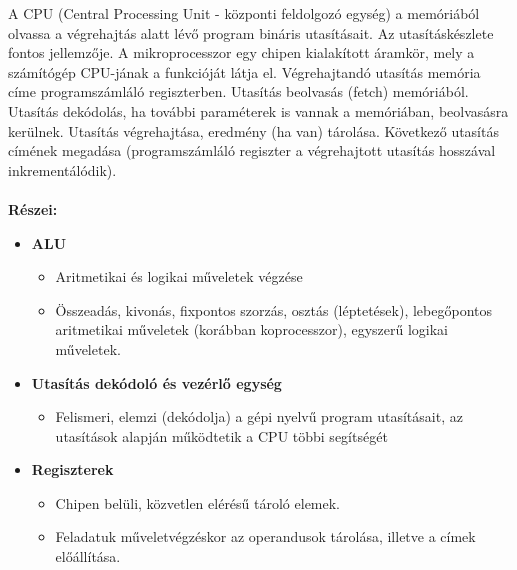 \documentclass[11pt,a4paper]{article}
\begin{document}
            \begin{tcolorbox}[colback=blue!5!white,colframe=blue!50!black,title= 13. Ismertesse a CPU részeit és működését egy utasítás végrehajtási folyamatában!]
            A CPU (Central Processing Unit - központi feldolgozó egység) a memóriából olvassa a
            végrehajtás alatt lévő program bináris utasításait. Az utasításkészlete fontos jellemzője.
            A mikroprocesszor egy chipen kialakított áramkör, mely a számítógép CPU-jának a
            funkcióját látja el. Végrehajtandó utasítás memória címe programszámláló regiszterben. Utasítás beolvasás (fetch) memóriából.
            Utasítás dekódolás, ha további paraméterek is vannak a memóriában,
            beolvasásra kerülnek.
            Utasítás végrehajtása, eredmény (ha van) tárolása.
            Következő utasítás címének megadása (programszámláló regiszter a
            végrehajtott utasítás hosszával inkrementálódik).\\
            \\
            \textbf{Részei:}  
                \begin{itemize}
                    \item \textbf{ALU}
                    \begin{itemize}
                        \item Aritmetikai és logikai műveletek végzése
                        \item Összeadás, kivonás, fixpontos szorzás, osztás (léptetések), lebegőpontos aritmetikai
                    műveletek (korábban koprocesszor), egyszerű logikai műveletek.
                    \end{itemize}
                    \item \textbf{Utasítás dekódoló és vezérlő egység}
                    \begin{itemize}
                        \item Felismeri, elemzi (dekódolja) a gépi nyelvű program utasításait, az utasítások alapján működtetik a CPU többi segítségét 
                    \end{itemize}
                    \item \textbf{Regiszterek}
                    \begin{itemize}
                        \item Chipen belüli, közvetlen elérésű tároló elemek.
                        \item Feladatuk műveletvégzéskor az operandusok tárolása, illetve a címek előállítása.

\end{itemize}
\end{itemize}
\end{tcolorbox}
\end{document}
